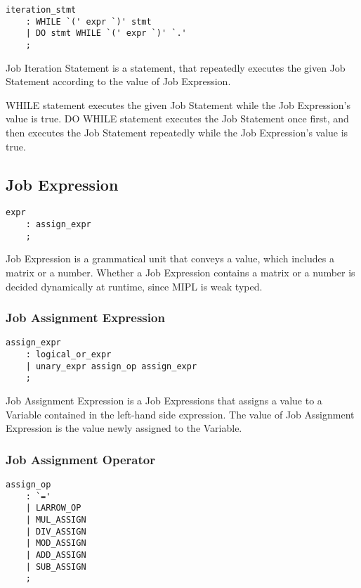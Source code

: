 \documentclass[prodmode,acmtecs]{acmsmall}
\begin{document}
\begin{lstlisting}
iteration_stmt
	: WHILE `(' expr `)' stmt
	| DO stmt WHILE `(' expr `)' `.'
	;
\end{lstlisting}

Job Iteration Statement is a statement, that repeatedly executes
the given Job Statement according to the value of Job Expression.

WHILE statement executes the given Job Statement while the Job
Expression's value is true.  DO WHILE statement executes the Job
Statement once first, and then executes the Job Statement repeatedly
while the Job Expression's value is true.


\subsection{Job Expression}

\begin{lstlisting}
expr
	: assign_expr
	;
\end{lstlisting}

Job Expression is a grammatical unit that conveys a value, which
includes a matrix or a number.  Whether a Job Expression contains
a matrix or a number is decided dynamically at runtime, since MIPL
is weak typed.


\subsubsection{Job Assignment Expression}

\begin{lstlisting}
assign_expr
	: logical_or_expr
	| unary_expr assign_op assign_expr
	;
\end{lstlisting}

\label{Assignment_Expression_Section}
Job Assignment Expression is a Job Expressions that assigns a value
to a Variable contained in the left-hand side expression.  The value
of Job Assignment Expression is the value newly assigned to the
Variable.


\subsubsection{Job Assignment Operator}

\begin{lstlisting}
assign_op
	: `='
	| LARROW_OP
	| MUL_ASSIGN
	| DIV_ASSIGN
	| MOD_ASSIGN
	| ADD_ASSIGN
	| SUB_ASSIGN
	;
\end{lstlisting}
\end{document}
